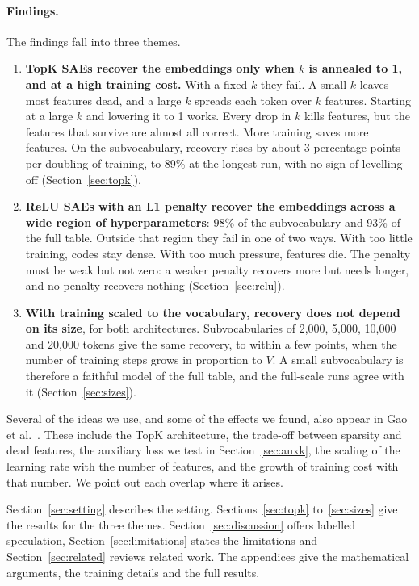 \documentclass[11pt]{article}
\begin{document}
\paragraph{Findings.} The findings fall into three themes.
\begin{enumerate}[leftmargin=*]
\item \textbf{TopK SAEs recover the embeddings only when $k$ is annealed to 1, and at a high training cost.} With a fixed $k$ they fail. A small $k$ leaves most features dead, and a large $k$ spreads each token over $k$ features. Starting at a large $k$ and lowering it to 1 works. Every drop in $k$ kills features, but the features that survive are almost all correct. More training saves more features. On the subvocabulary, recovery rises by about 3 percentage points per doubling of training, to 89\% at the longest run, with no sign of levelling off (Section~\ref{sec:topk}).
\item \textbf{ReLU SAEs with an L1 penalty recover the embeddings across a wide region of hyperparameters}: 98\% of the subvocabulary and 93\% of the full table. Outside that region they fail in one of two ways. With too little training, codes stay dense. With too much pressure, features die. The penalty must be weak but not zero: a weaker penalty recovers more but needs longer, and no penalty recovers nothing (Section~\ref{sec:relu}).
\item \textbf{With training scaled to the vocabulary, recovery does not depend on its size}, for both architectures. Subvocabularies of 2,000, 5,000, 10,000 and 20,000 tokens give the same recovery, to within a few points, when the number of training steps grows in proportion to $V$. A small subvocabulary is therefore a faithful model of the full table, and the full-scale runs agree with it (Section~\ref{sec:sizes}).
\end{enumerate}

Several of the ideas we use, and some of the effects we found, also appear in Gao et al.~\cite{gao2024scaling}. These include the TopK architecture, the trade-off between sparsity and dead features, the auxiliary loss we test in Section~\ref{sec:auxk}, the scaling of the learning rate with the number of features, and the growth of training cost with that number. We point out each overlap where it arises.

Section~\ref{sec:setting} describes the setting. Sections~\ref{sec:topk} to~\ref{sec:sizes} give the results for the three themes. Section~\ref{sec:discussion} offers labelled speculation, Section~\ref{sec:limitations} states the limitations and Section~\ref{sec:related} reviews related work. The appendices give the mathematical arguments, the training details and the full results.
\end{document}
